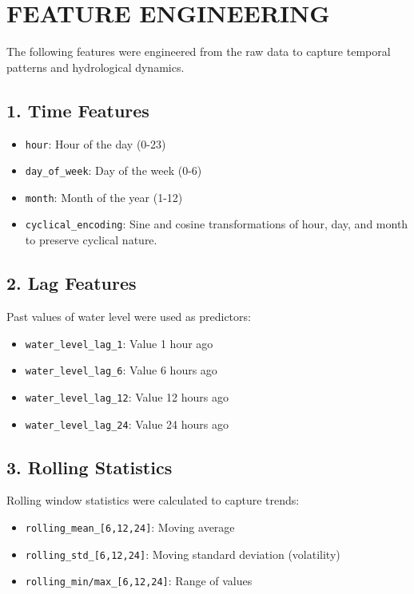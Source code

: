 \newpage
{}
{}
\stoptocwriting
\chapter{FEATURE ENGINEERING}
\resumetocwriting

The following features were engineered from the raw data to capture temporal patterns and hydrological dynamics.

\section*{1. Time Features}
\begin{itemize}
    \item \texttt{hour}: Hour of the day (0-23)
    \item \texttt{day\_of\_week}: Day of the week (0-6)
    \item \texttt{month}: Month of the year (1-12)
    \item \texttt{cyclical\_encoding}: Sine and cosine transformations of hour, day, and month to preserve cyclical nature.
\end{itemize}

\section*{2. Lag Features}
Past values of water level were used as predictors:
\begin{itemize}
    \item \texttt{water\_level\_lag\_1}: Value 1 hour ago
    \item \texttt{water\_level\_lag\_6}: Value 6 hours ago
    \item \texttt{water\_level\_lag\_12}: Value 12 hours ago
    \item \texttt{water\_level\_lag\_24}: Value 24 hours ago
\end{itemize}

\section*{3. Rolling Statistics}
Rolling window statistics were calculated to capture trends:
\begin{itemize}
    \item \texttt{rolling\_mean\_[6,12,24]}: Moving average
    \item \texttt{rolling\_std\_[6,12,24]}: Moving standard deviation (volatility)
    \item \texttt{rolling\_min/max\_[6,12,24]}: Range of values
\end{itemize}

